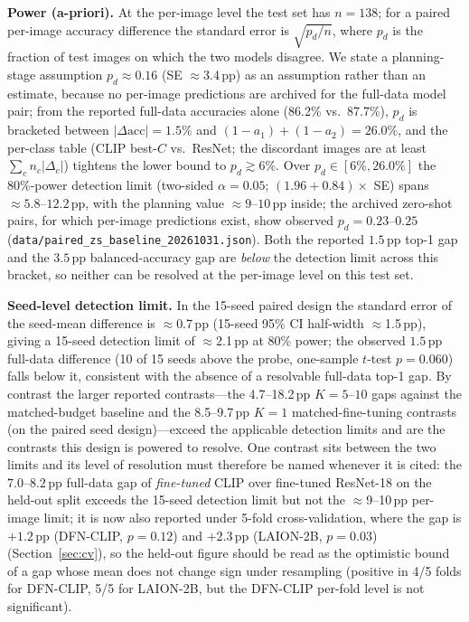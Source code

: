 \documentclass[10pt,a4paper]{article}
\begin{document}
\textbf{Power (a-priori).} At the per-image level the test set has $n=138$; for a paired per-image accuracy difference the standard error is $\sqrt{p_d/n}$, where $p_d$ is the fraction of test images on which the two models disagree. We state a planning-stage assumption $p_d{\approx}0.16$ (SE $\approx$3.4\,pp) as an assumption rather than an estimate, because no per-image predictions are archived for the full-data model pair; from the reported full-data accuracies alone (86.2\% vs.\ 87.7\%), $p_d$ is bracketed between $|\Delta\mathrm{acc}|{=}1.5\%$ and $(1-a_1){+}(1-a_2){=}26.0\%$, and the per-class table (CLIP best-$C$ vs.\ ResNet; the discordant images are at least $\sum_c n_c|\Delta_c|$) tightens the lower bound to $p_d \gtrsim 6\%$. Over $p_d\in[6\%,26.0\%]$ the 80\%-power detection limit (two-sided $\alpha{=}0.05$; $(1.96{+}0.84)\times$ SE) spans ${\approx}5.8$--$12.2$\,pp, with the planning value ${\approx}9$--$10$\,pp inside; the archived zero-shot pairs, for which per-image predictions exist, show observed $p_d{=}0.23$--$0.25$ (\texttt{data/paired\_zs\_baseline\_20261031.json}). Both the reported $1.5$\,pp top-1 gap and the $3.5$\,pp balanced-accuracy gap are \emph{below} the detection limit across this bracket, so neither can be resolved at the per-image level on this test set.

\textbf{Seed-level detection limit.} In the 15-seed paired design the standard error of the seed-mean difference is $\approx$0.7\,pp (15-seed 95\% CI half-width $\approx$1.5\,pp), giving a 15-seed detection limit of $\approx$2.1\,pp at 80\% power; the observed $1.5$\,pp full-data difference (10 of 15 seeds above the probe, one-sample $t$-test $p=0.060$) falls below it, consistent with the absence of a resolvable full-data top-1 gap. By contrast the larger reported contrasts---the 4.7--18.2\,pp $K{=}5$--$10$ gaps against the matched-budget baseline and the 8.5--9.7\,pp $K{=}1$ matched-fine-tuning contrasts (on the paired seed design)---exceed the applicable detection limits and are the contrasts this design is powered to resolve. One contrast sits between the two limits and its level of resolution must therefore be named whenever it is cited: the $7.0$--$8.2$\,pp full-data gap of \emph{fine-tuned} CLIP over fine-tuned ResNet-18 on the held-out split exceeds the 15-seed detection limit but not the $\approx$9--10\,pp per-image limit; it is now also reported under 5-fold cross-validation, where the gap is $+1.2$\,pp (DFN-CLIP, $p{=}0.12$) and $+2.3$\,pp (LAION-2B, $p{=}0.03$) (Section~\ref{sec:cv}), so the held-out figure should be read as the optimistic bound of a gap whose mean does not change sign under resampling (positive in 4/5 folds for DFN-CLIP, 5/5 for LAION-2B, but the DFN-CLIP per-fold level is not significant).
\end{document}
